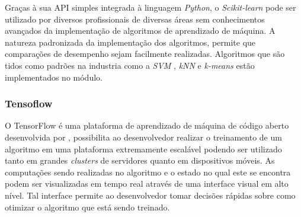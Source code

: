 Graças à sua API simples integrada à linguagem \textit{Python}, o \textit{Scikit-learn} pode ser utilizado por diversos profissionais de diversas áreas sem conhecimentos avançados da implementação de algoritmos de aprendizado de máquina. A natureza padronizada da implementação dos algoritmos, permite que comparações de desempenho sejam facilmente realizadas. Algoritmos que são tidos como padrões na industria como a \textit{SVM} \cite{cortes:1995svm}, \textit{kNN} \cite{cover:1967knn} e \textit{k-means} \cite{macqueen:1967kmeans} estão implementados no módulo. \cite{scikit-learn}


\subsubsection{Tensoflow}

O TensorFlow é uma plataforma de aprendizado de máquina de código aberto desenvolvida por , possibilita ao desenvolvedor realizar o treinamento de um algoritmo em uma plataforma extremamente escalável podendo ser utilizado tanto em grandes \textit{clusters} de servidores quanto em dispositivos móveis. As computações sendo realizadas no algoritmo e o estado no qual este se encontra podem ser visualizadas em tempo real através de uma interface visual em alto nível. Tal interface permite ao desenvolvedor tomar decisões rápidas sobre como otimizar o algoritmo que está sendo treinado.


